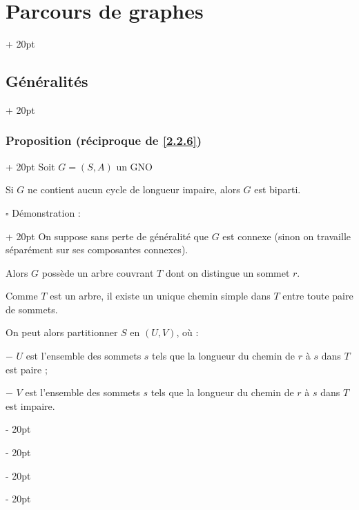 \documentclass[a4paper, 12pt, twoside]{article}
\newcommand{\ind}[1][20pt]{\advance\leftskip + #1}
\newcommand{\deind}[1][20pt]{\advance\leftskip - #1}
\newenvironment{indt}[2][20pt]{#2 \par \ind[#1]}{\par \deind} %
\begin{document}
\begin{indt}{\section{Parcours de graphes}}
\begin{indt}{\subsection{Généralités}}
            \vspace{12pt}
            
            \begin{indt}{\subsubsection{Proposition (réciproque de \ref{2.2.6})}}
                \label{4.1.8}
                Soit $G = (S, A)$ un GNO

                Si $G$ ne contient aucun cycle de longueur impaire, alors $G$ est biparti.

                \vspace{6pt}
                
                \begin{indt}{$\square$ Démonstration :}
                    On suppose sans perte de généralité que $G$ est connexe (sinon on travaille séparément sur ses composantes connexes).

                    Alors $G$ possède un arbre couvrant $T$ dont on distingue un sommet $r$.

                    Comme $T$ est un arbre, il existe un unique chemin simple dans $T$ entre toute paire de sommets.

                    \begin{center}
                    \end{center}


                    On peut alors partitionner $S$ en $(U, V)$, où :

                    $-$ $U$ est l'ensemble des sommets $s$ tels que la longueur du chemin de $r$ à $s$ dans $T$ est paire ;

                    $-$ $V$ est l'ensemble des sommets $s$ tels que la longueur du chemin de $r$ à $s$ dans $T$ est impaire.


\end{indt}
\end{indt}
\end{indt}
\end{indt}
\end{document}
